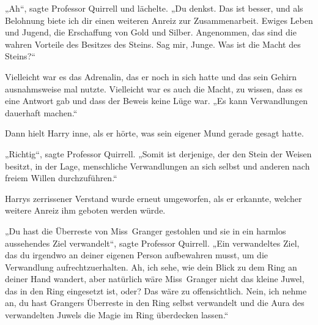 „Ah“, sagte Professor Quirrell und lächelte.
„Du denkst. Das ist besser, und als Belohnung biete ich dir einen weiteren Anreiz zur Zusammenarbeit. Ewiges Leben und Jugend, die Erschaffung von Gold und Silber. Angenommen, das sind die wahren Vorteile des Besitzes des Steins. Sag mir, Junge. Was ist die Macht des Steins?“

Vielleicht war es das Adrenalin, das er noch in sich hatte und das sein Gehirn ausnahmsweise mal nutzte. Vielleicht war es auch die Macht, zu wissen, dass es eine Antwort gab und dass der Beweis keine Lüge war.
„Es kann Verwandlungen dauerhaft machen.“

Dann hielt Harry inne, als er hörte, was sein eigener Mund gerade gesagt hatte.

„Richtig“, sagte Professor Quirrell.
„Somit ist derjenige, der den Stein der Weisen besitzt, in der Lage, menschliche Verwandlungen an sich selbst und anderen nach freiem Willen durchzuführen.“

Harrys zerrissener Verstand wurde erneut umgeworfen, als er erkannte, welcher weitere Anreiz ihm geboten werden würde.

„Du hast die Überreste von Miss~Granger gestohlen und sie in ein harmlos aussehendes Ziel verwandelt“, sagte Professor Quirrell.
„Ein verwandeltes Ziel, das du irgendwo an deiner eigenen Person aufbewahren musst, um die Verwandlung aufrechtzuerhalten. Ah, ich sehe, wie dein Blick zu dem Ring an deiner Hand wandert, aber natürlich wäre Miss~Granger nicht das kleine Juwel, das in den Ring eingesetzt ist, oder? Das wäre zu offensichtlich. Nein, ich nehme an, du hast Grangers Überreste in den Ring selbst verwandelt und die Aura des verwandelten Juwels die Magie im Ring überdecken lassen.“

